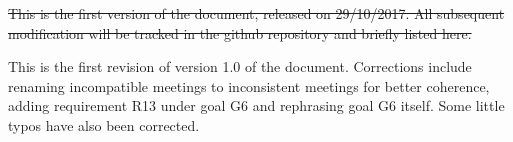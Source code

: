 \st{This is the first version of the document, released on 29/10/2017.
All subsequent modification will be tracked in the github repository and briefly listed here.}

This is the first revision of version 1.0 of the document. Corrections include renaming incompatible meetings to inconsistent meetings for better coherence, adding requirement R13 under goal G6 and rephrasing goal G6 itself. Some little typos have also been corrected.